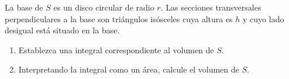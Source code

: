 \item La base de $S$ es un disco circular de radio $r$. Las secciones transversales perpendiculares a la base son triángulos isósceles cuya altura es $h$ y cuyo lado desigual está situado en la base.
\begin{enumerate}
    \item[(a)] Establezca una integral correspondiente al volumen de $S$.
    \item[(b)] Interpretando la integral como un área, calcule el volumen de $S$.
\end{enumerate}
